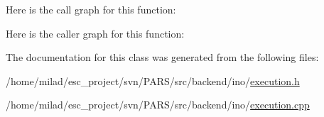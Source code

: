 Here is the call graph for this function:




Here is the caller graph for this function:




The documentation for this class was generated from the following files:\begin{DoxyCompactItemize}
\item 
/home/milad/esc\_\-project/svn/PARS/src/backend/ino/\hyperlink{ino_2execution_8h}{execution.h}\item 
/home/milad/esc\_\-project/svn/PARS/src/backend/ino/\hyperlink{ino_2execution_8cpp}{execution.cpp}\end{DoxyCompactItemize}
